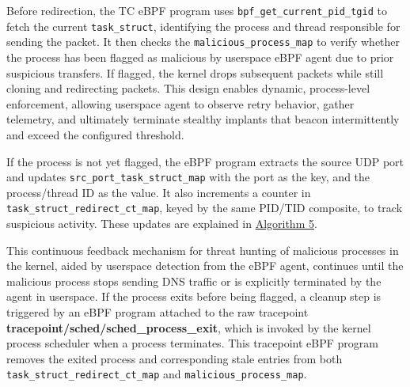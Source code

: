 \documentclass [11pt, proquest] {uwthesis}[2020/02/24]
\begin{document}
Before redirection, the TC eBPF program uses \texttt{bpf\_get\_current\_pid\_tgid} to fetch the current \texttt{task\_struct}, identifying the process and thread responsible for sending the packet. It then checks the \texttt{malicious\_process\_map} to verify whether the process has been flagged as malicious by userspace eBPF agent due to prior suspicious transfers. If flagged, the kernel drops subsequent packets while still cloning and redirecting packets. This design enables dynamic, process-level enforcement, allowing userspace agent to observe retry behavior, gather telemetry, and ultimately terminate stealthy implants that beacon intermittently and exceed the configured threshold.

If the process is not yet flagged, the eBPF program extracts the source UDP port and updates \texttt{src\_port\_task\_struct\_map} with the port as the key, and the process/thread ID as the value. It also increments a counter in \texttt{task\_struct\_redirect\_ct\_map}, keyed by the same PID/TID composite, to track suspicious activity. These updates are explained in \hyperref[sec:alg5]{Algorithm 5}.

This continuous feedback mechanism for threat hunting of malicious processes in the kernel, aided by userspace detection from the eBPF agent, continues until the malicious process stops sending DNS traffic or is explicitly terminated by the agent in userspace. If the process exits before being flagged, a cleanup step is triggered by an eBPF program attached to the raw tracepoint \textbf{tracepoint/sched/sched\_process\_exit}, which is invoked by the kernel process scheduler when a process terminates. This tracepoint eBPF program removes the exited process and corresponding stale entries from both \texttt{task\_struct\_redirect\_ct\_map} and \texttt{malicious\_process\_map}.

\end{document}
